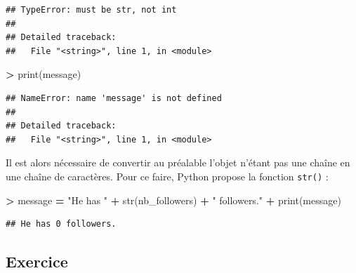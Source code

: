 \documentclass[12pt,]{book}
\newenvironment{Shaded}{\begin{snugshade}}{\end{snugshade}}
\newcommand{\StringTok}[1]{\textcolor[rgb]{0.31,0.60,0.02}{#1}}
\newcommand{\OperatorTok}[1]{\textcolor[rgb]{0.81,0.36,0.00}{\textbf{#1}}}
\newcommand{\BuiltInTok}[1]{#1}
\newcommand{\NormalTok}[1]{#1}
\numberwithin{equation}{section}
\numberwithin{countremarque}{section}
\begin{document}
\begin{lstlisting}
## TypeError: must be str, not int
## 
## Detailed traceback: 
##   File "<string>", line 1, in <module>
\end{lstlisting}

\begin{Shaded}
\begin{Highlighting}[]
\OperatorTok{>} \BuiltInTok{print}\NormalTok{(message)}
\end{Highlighting}
\end{Shaded}

\begin{lstlisting}
## NameError: name 'message' is not defined
## 
## Detailed traceback: 
##   File "<string>", line 1, in <module>
\end{lstlisting}

Il est alors nécessaire de convertir au préalable l'objet n'étant pas
une chaîne en une chaîne de caractères. Pour ce faire, Python propose la
fonction \texttt{str()} :

\begin{Shaded}
\begin{Highlighting}[]
\OperatorTok{>}\NormalTok{ message }\OperatorTok{=} \StringTok{"He has "} \OperatorTok{+} \BuiltInTok{str}\NormalTok{(nb_followers) }\OperatorTok{+} \StringTok{" followers."}
\OperatorTok{+} \BuiltInTok{print}\NormalTok{(message)}
\end{Highlighting}
\end{Shaded}

\begin{lstlisting}
## He has 0 followers.
\end{lstlisting}

\subsection{Exercice}\label{exercice}
\end{document}
